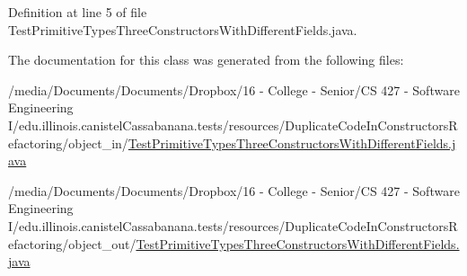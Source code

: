 Definition at line 5 of file TestPrimitiveTypesThreeConstructorsWithDifferentFields.java.



The documentation for this class was generated from the following files:\begin{DoxyCompactItemize}
\item 
/media/Documents/Documents/Dropbox/16 -\/ College -\/ Senior/CS 427 -\/ Software Engineering I/edu.illinois.canistelCassabanana.tests/resources/DuplicateCodeInConstructorsRefactoring/object\_\-in/\hyperlink{object__in_2TestPrimitiveTypesThreeConstructorsWithDifferentFields_8java}{TestPrimitiveTypesThreeConstructorsWithDifferentFields.java}\item 
/media/Documents/Documents/Dropbox/16 -\/ College -\/ Senior/CS 427 -\/ Software Engineering I/edu.illinois.canistelCassabanana.tests/resources/DuplicateCodeInConstructorsRefactoring/object\_\-out/\hyperlink{object__out_2TestPrimitiveTypesThreeConstructorsWithDifferentFields_8java}{TestPrimitiveTypesThreeConstructorsWithDifferentFields.java}\end{DoxyCompactItemize}
